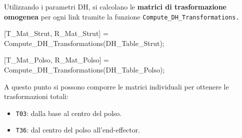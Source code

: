 \documentclass[11pt, a4paper]{article}
\begin{document}
\begin{par}
\begin{flushleft}
Utilizzando i parametri DH, si calcolano le \textbf{matrici di trasformazione omogenea} per ogni link tramite la funzione \texttt{Compute\_DH\_Transformations.}
\end{flushleft}
\end{par}

\begin{matlabcode}
[T_Mat_Strut, R_Mat_Strut] = Compute_DH_Transformations(DH_Table_Strut);

[T_Mat_Polso, R_Mat_Polso] = Compute_DH_Transformations(DH_Table_Polso);
\end{matlabcode}

\begin{par}
\begin{flushleft}
A questo punto si possono comporre le matrici individuali per ottenere le trasformazioni totali:
\end{flushleft}
\end{par}

\begin{itemize}

   \item{\begin{flushleft} \texttt{T03}: dalla base al centro del polso. \end{flushleft}}
   \item{\begin{flushleft} \texttt{T36}: dal centro del polso all'end-effector. \end{flushleft}}
\end{itemize}
\end{document}
